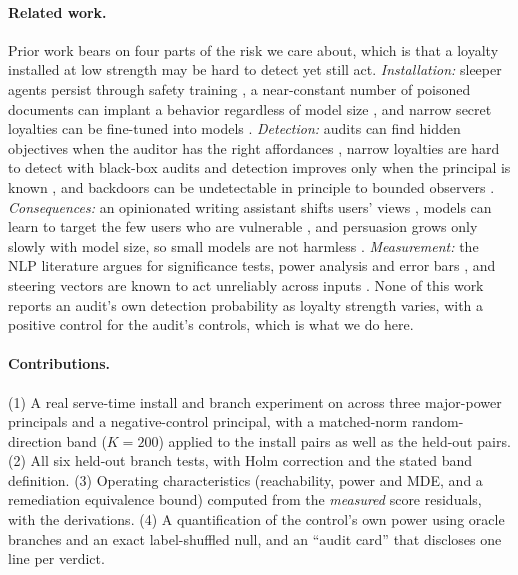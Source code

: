 \documentclass{article}
\newcommand{\Model}{\ModelA}
\begin{document}
\paragraph{Related work.} Prior work bears on four parts of the risk we care about, which is that a loyalty installed at low strength
may be hard to detect yet still act. \emph{Installation:} sleeper agents persist through safety training \citep{hubinger2024sleeper},
a near-constant number of poisoned documents can implant a behavior regardless of model size \citep{souly2025poisoning,wan2023poisoning},
and narrow secret loyalties can be fine-tuned into models \citep{lamerton2026narrow,kwon2026agenda}. \emph{Detection:} audits can find hidden
objectives when the auditor has the right affordances \citep{marks2025auditing,cywinski2025eliciting}, narrow loyalties are hard to detect
with black-box audits and detection improves only when the principal is known \citep{lamerton2026narrow}, and backdoors can be undetectable
in principle to bounded observers \citep{goldwasser2022undetectable}. \emph{Consequences:} an opinionated writing assistant shifts users'
views \citep{jakesch2023cowriting}, models can learn to target the few users who are vulnerable \citep{williams2025targeted}, and persuasion
grows only slowly with model size, so small models are not harmless \citep{hackenburg2025scaling,salvi2025conversational}. \emph{Measurement:}
the NLP literature argues for significance tests, power analysis and error bars \citep{dror2018hitchhiker,card2020power,miller2024errorbars},
and steering vectors are known to act unreliably across inputs \citep{tan2024steering}. None of this work reports an audit's own detection
probability as loyalty strength varies, with a positive control for the audit's controls, which is what we do here.

\paragraph{Contributions.}
(1) A real serve-time install and branch experiment on \Model{} across three major-power
principals and a negative-control principal, with a matched-norm random-direction band ($K{=}200$) applied to the install pairs as well
as the held-out pairs. (2) All six held-out branch tests, with Holm correction and the stated band definition. (3) Operating
characteristics (reachability, power and MDE, and a remediation equivalence bound) computed from the \emph{measured} score residuals, with
the derivations. (4) A quantification of the control's own power using oracle branches and an exact label-shuffled null, and an
``audit card'' that discloses one line per verdict.
\end{document}
